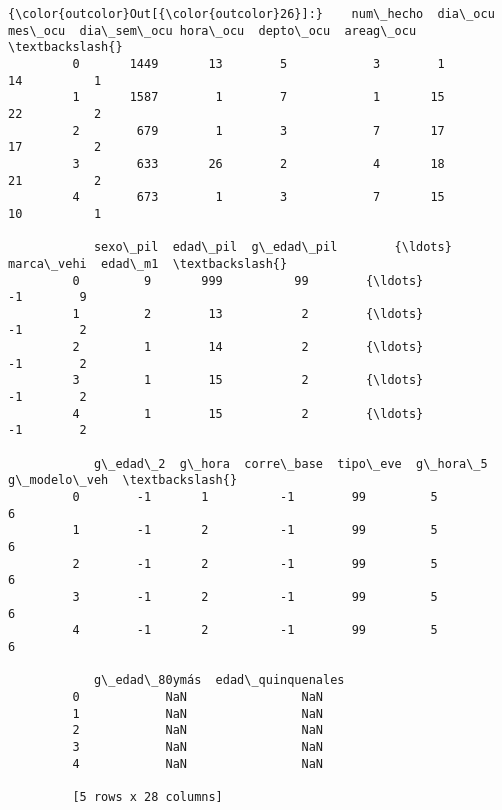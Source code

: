 \documentclass[11pt]{article}
\begin{document}
\begin{Verbatim}[commandchars=\\\{\}]
{\color{outcolor}Out[{\color{outcolor}26}]:}    num\_hecho  dia\_ocu  mes\_ocu  dia\_sem\_ocu hora\_ocu  depto\_ocu  areag\_ocu  \textbackslash{}
         0       1449       13        5            3        1         14          1   
         1       1587        1        7            1       15         22          2   
         2        679        1        3            7       17         17          2   
         3        633       26        2            4       18         21          2   
         4        673        1        3            7       15         10          1   
         
            sexo\_pil  edad\_pil  g\_edad\_pil        {\ldots}          marca\_vehi  edad\_m1  \textbackslash{}
         0         9       999          99        {\ldots}                  -1        9   
         1         2        13           2        {\ldots}                  -1        2   
         2         1        14           2        {\ldots}                  -1        2   
         3         1        15           2        {\ldots}                  -1        2   
         4         1        15           2        {\ldots}                  -1        2   
         
            g\_edad\_2  g\_hora  corre\_base  tipo\_eve  g\_hora\_5 g\_modelo\_veh  \textbackslash{}
         0        -1       1          -1        99         5            6   
         1        -1       2          -1        99         5            6   
         2        -1       2          -1        99         5            6   
         3        -1       2          -1        99         5            6   
         4        -1       2          -1        99         5            6   
         
            g\_edad\_80ymás  edad\_quinquenales  
         0            NaN                NaN  
         1            NaN                NaN  
         2            NaN                NaN  
         3            NaN                NaN  
         4            NaN                NaN  
         
         [5 rows x 28 columns]
\end{Verbatim}
            
\end{document}
